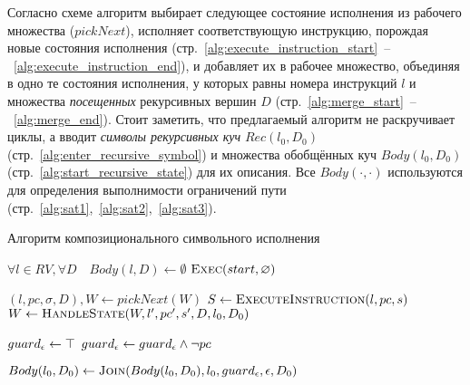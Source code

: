 Согласно схеме алгоритм выбирает следующее состояние исполнения из рабочего множества ($pickNext$), 
исполняет соответствующую инструкцию, порождая новые состояния исполнения 
(стр.~\ref{alg:execute_instruction_start}~--~\ref{alg:execute_instruction_end}), и добавляет их в рабочее множество, 
объединяя в одно те состояния исполнения, у которых равны номера инструкций $l$ и множества \emph{посещенных} рекурсивных вершин $D$
(стр.~\ref{alg:merge_start}~--~\ref{alg:merge_end}).
Стоит заметить, что предлагаемый алгоритм не раскручивает циклы, 
а вводит \emph{символы рекурсивных куч} $Rec(l_0, D_0)$ (стр.~\ref{alg:enter_recursive_symbol})
и множества обобщённых куч $Body(l_0,D_0)$ (стр.~\ref{alg:start_recursive_state}) для их описания.
Все $Body(\cdot,\cdot)$ используются для определения выполнимости ограничений пути 
(стр.~\ref{alg:sat1},~\ref{alg:sat2},~\ref{alg:sat3}).

\begin{algorithm}[H]
    \caption{Алгоритм композиционального символьного исполнения}\label{compositional_algo}
\begin{algorithmic}[1]
    \State $\forall l \in RV, \forall D \quad Body(l,D) \gets \emptyset$
    \State \Return $\text{$\textsc{Exec}(start,\emptyset)$}$ \label{alg:start_vertex}
    
         \label{alg:while_start}
            \State $(l,pc,\sigma,D), W \gets pickNext(W)$
            \State $S \gets \textsc{ExecuteInstruction}(l,pc,s)$
                \State $W \gets \textsc{HandleState}(W, l',pc',s', D, l_0, D_0)$
            \EndFor
        \EndWhile \label{alg:while_end}
    
            \State $guard_{\emptyheap} \gets \top$ \label{alg:epsilon_equation_start}
               \State $guard_{\emptyheap} \gets guard_{\emptyheap} \land \lnot pc$
            \EndFor

            \State $Body(l_0,D_0) \gets \textsc{Join}(Body(l_0,D_0), l_0, guard_{\emptyheap}, \emptyheap, D_0)$ \label{alg:epsilon_equation_end}
        \Else
                \label{alg:print_errors}\;  
        \EndIf
    \EndProcedure
\end{algorithmic}
\end{algorithm}


